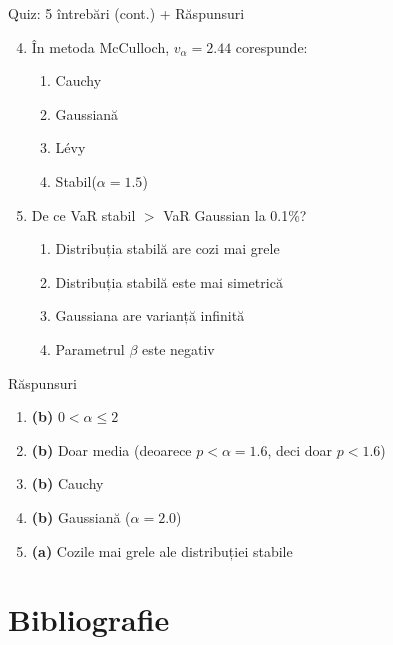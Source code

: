 \documentclass[9pt, aspectratio=169, t]{beamer}
\theoremstyle{definition}
\begin{document}
\begin{frame}{Quiz: 5 întrebări (cont.) + Răspunsuri}
\begin{enumerate}
    \setcounter{enumi}{3}
    \item În metoda McCulloch, $v_\alpha = 2.44$ corespunde:
    \begin{enumerate}
        \item[(a)] Cauchy
        \item[(b)] Gaussiană
        \item[(c)] L\'{e}vy
        \item[(d)] Stabil($\alpha = 1.5$)
    \end{enumerate}

    \vspace{0.2cm}
    \item De ce VaR stabil $>$ VaR Gaussian la 0.1\%?
    \begin{enumerate}
        \item[(a)] Distribuția stabilă are cozi mai grele
        \item[(b)] Distribuția stabilă este mai simetrică
        \item[(c)] Gaussiana are varianță infinită
        \item[(d)] Parametrul $\beta$ este negativ
    \end{enumerate}
\end{enumerate}

\vspace{0.3cm}
\begin{exampleblock}{Răspunsuri}
\begin{enumerate}
    \item \textbf{(b)} $0 < \alpha \leq 2$
    \item \textbf{(b)} Doar media (deoarece $p < \alpha = 1.6$, deci doar $p < 1.6$)
    \item \textbf{(b)} Cauchy
    \item \textbf{(b)} Gaussiană ($\alpha = 2.0$)
    \item \textbf{(a)} Cozile mai grele ale distribuției stabile
\end{enumerate}
\end{exampleblock}
\end{frame}

\section{Bibliografie}
\end{document}

